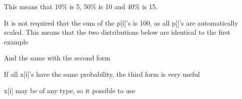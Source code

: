\documentclass[letterpaper,10pt,english]{sphinxmanual}
\begin{document}
This means that 10\% is 5, 50\% is 10 and 40\% is 15.

It is not required that the sum of the p{[}i{]}’s is 100, as all p{[}{]}’s are automatically scaled. This means that the two distributions below are
identical to the first example

\begin{sphinxVerbatim}[commandchars=\\\{\}]
       
               
\end{sphinxVerbatim}

And the same with the second form

\begin{sphinxVerbatim}[commandchars=\\\{\}]
       
\end{sphinxVerbatim}

If all x{[}i{]}’s have the same probability, the third form is very useful

\begin{sphinxVerbatim}[commandchars=\\\{\}]
    
    
\end{sphinxVerbatim}

x{[}i{]} may be of any type, so it possible to use
\end{document}
